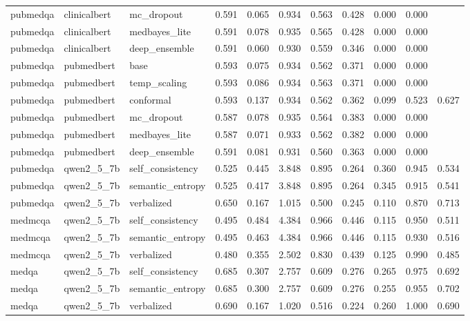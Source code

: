 \begin{table}[htbp]
\begin{tabular}{lllllllllll}
pubmedqa & clinicalbert & mc\_dropout & 0.591 & 0.065 & 0.934 & 0.563 & 0.428 & 0.000 & 0.000 &  \\
pubmedqa & clinicalbert & medbayes\_lite & 0.591 & 0.078 & 0.935 & 0.565 & 0.428 & 0.000 & 0.000 &  \\
pubmedqa & clinicalbert & deep\_ensemble & 0.591 & 0.060 & 0.930 & 0.559 & 0.346 & 0.000 & 0.000 &  \\
pubmedqa & pubmedbert & base & 0.593 & 0.075 & 0.934 & 0.562 & 0.371 & 0.000 & 0.000 &  \\
pubmedqa & pubmedbert & temp\_scaling & 0.593 & 0.086 & 0.934 & 0.563 & 0.371 & 0.000 & 0.000 &  \\
pubmedqa & pubmedbert & conformal & 0.593 & 0.137 & 0.934 & 0.562 & 0.362 & 0.099 & 0.523 & 0.627 \\
pubmedqa & pubmedbert & mc\_dropout & 0.587 & 0.078 & 0.935 & 0.564 & 0.383 & 0.000 & 0.000 &  \\
pubmedqa & pubmedbert & medbayes\_lite & 0.587 & 0.071 & 0.933 & 0.562 & 0.382 & 0.000 & 0.000 &  \\
pubmedqa & pubmedbert & deep\_ensemble & 0.591 & 0.081 & 0.931 & 0.560 & 0.363 & 0.000 & 0.000 &  \\
pubmedqa & qwen2\_5\_7b & self\_consistency & 0.525 & 0.445 & 3.848 & 0.895 & 0.264 & 0.360 & 0.945 & 0.534 \\
pubmedqa & qwen2\_5\_7b & semantic\_entropy & 0.525 & 0.417 & 3.848 & 0.895 & 0.264 & 0.345 & 0.915 & 0.541 \\
pubmedqa & qwen2\_5\_7b & verbalized & 0.650 & 0.167 & 1.015 & 0.500 & 0.245 & 0.110 & 0.870 & 0.713 \\
medmcqa & qwen2\_5\_7b & self\_consistency & 0.495 & 0.484 & 4.384 & 0.966 & 0.446 & 0.115 & 0.950 & 0.511 \\
medmcqa & qwen2\_5\_7b & semantic\_entropy & 0.495 & 0.463 & 4.384 & 0.966 & 0.446 & 0.115 & 0.930 & 0.516 \\
medmcqa & qwen2\_5\_7b & verbalized & 0.480 & 0.355 & 2.502 & 0.830 & 0.439 & 0.125 & 0.990 & 0.485 \\
medqa & qwen2\_5\_7b & self\_consistency & 0.685 & 0.307 & 2.757 & 0.609 & 0.276 & 0.265 & 0.975 & 0.692 \\
medqa & qwen2\_5\_7b & semantic\_entropy & 0.685 & 0.300 & 2.757 & 0.609 & 0.276 & 0.255 & 0.955 & 0.702 \\
medqa & qwen2\_5\_7b & verbalized & 0.690 & 0.167 & 1.020 & 0.516 & 0.224 & 0.260 & 1.000 & 0.690 \\
\bottomrule
\end{tabular}
\end{table}
